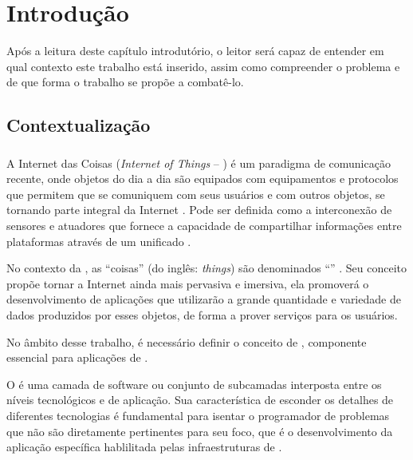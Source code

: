 \chapter{Introdução}

Após a leitura deste capítulo introdutório, o leitor será capaz de entender em qual contexto este trabalho está inserido, assim como compreender o problema e de que forma o trabalho se propõe a combatê-lo.

\section{Contextualização}

\subsection{\iot}

A Internet das Coisas (\textit{Internet of Things} -- \iot) é um paradigma de comunicação recente, onde objetos do dia a dia são equipados com equipamentos e protocolos que permitem que se comuniquem com seus usuários e com outros objetos, se tornando parte integral da Internet \cite{Atzori:2010}.  Pode ser definida como a interconexão de sensores e atuadores que fornece a capacidade de compartilhar informações entre plataformas através de um \framework unificado \cite{gubbi2013internet}. 

No contexto da \iot, as ``coisas'' (do inglês: \textit{things}) são denominados ``\smartobjs'' \cite{bandyopadhyay2011internet}. Seu conceito propõe tornar a Internet ainda mais pervasiva e imersiva, ela promoverá o desenvolvimento de aplicações que utilizarão a grande quantidade e variedade de dados produzidos por esses objetos, de forma a prover serviços para os usuários. 


No âmbito desse trabalho, é necessário definir o conceito de \middleware, componente essencial para aplicações de \iot.
\begin{citacao}
	O \middleware é uma camada de software ou conjunto de subcamadas interposta entre os níveis tecnológicos e de aplicação. Sua característica de esconder os detalhes de diferentes tecnologias é fundamental para isentar o programador de problemas que não são diretamente pertinentes para seu foco, que é o desenvolvimento da aplicação específica hablilitada pelas infraestruturas de \iot \cite[tradução~nossa]{Atzori:2010}.
\end{citacao}

